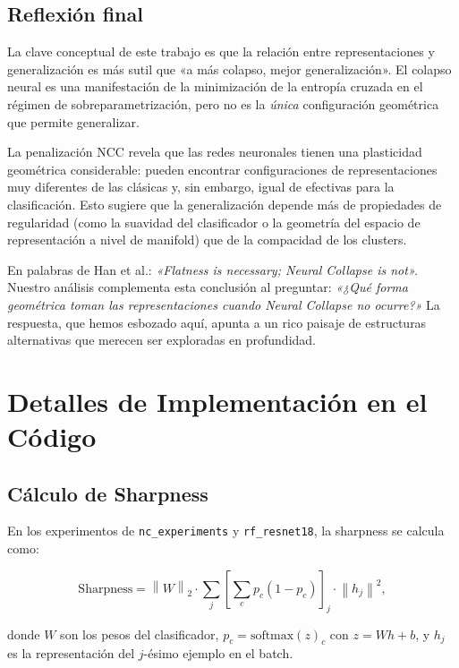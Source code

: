 \documentclass[12pt,a4paper]{report}
\newcommand{\norm}[1]{\left\lVert#1\right\rVert}
\begin{document}
\section{Reflexión final}

La clave conceptual de este trabajo es que la relación entre representaciones y generalización es más sutil que «a más colapso, mejor generalización». El colapso neural es una manifestación de la minimización de la entropía cruzada en el régimen de sobreparametrización, pero no es la \emph{única} configuración geométrica que permite generalizar.

La penalización NCC revela que las redes neuronales tienen una plasticidad geométrica considerable: pueden encontrar configuraciones de representaciones muy diferentes de las clásicas y, sin embargo, igual de efectivas para la clasificación. Esto sugiere que la generalización depende más de propiedades de regularidad (como la suavidad del clasificador o la geometría del espacio de representación a nivel de manifold) que de la compacidad de los clusters.

En palabras de Han et al.: \textit{«Flatness is necessary; Neural Collapse is not».} Nuestro análisis complementa esta conclusión al preguntar: \textit{«¿Qué forma geométrica toman las representaciones cuando Neural Collapse no ocurre?»} La respuesta, que hemos esbozado aquí, apunta a un rico paisaje de estructuras alternativas que merecen ser exploradas en profundidad.

\appendix
\chapter{Detalles de Implementación en el Código}
\label{app:code}

\section{Cálculo de Sharpness}

En los experimentos de \texttt{nc\_experiments} y \texttt{rf\_resnet18}, la sharpness se calcula como:

\begin{equation}
    \text{Sharpness} = \norm{W}_2 \cdot \sum_{j} \left[\sum_{c} p_c(1-p_c)\right]_j \cdot \norm{h_j}^2,
\end{equation}

donde $W$ son los pesos del clasificador, $p_c = \text{softmax}(z)_c$ con $z = Wh + b$, y $h_j$ es la representación del $j$-ésimo ejemplo en el batch.
\end{document}
